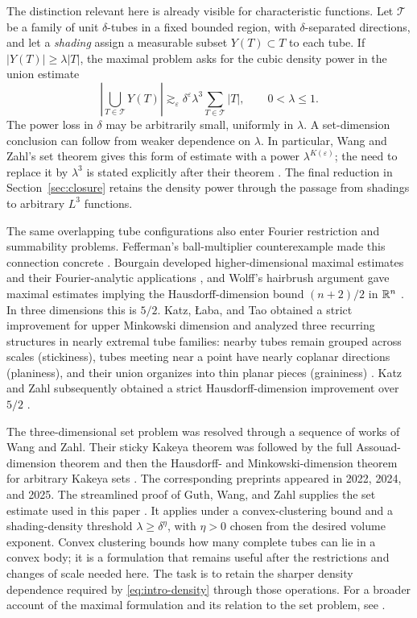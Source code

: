 The distinction relevant here is already visible for characteristic
functions. Let \(\mathcal T\) be a family of unit \(\delta\)-tubes in a fixed bounded region, with
\(\delta\)-separated directions, and let a \emph{shading} assign a
measurable subset \(Y(T)\subset T\) to each tube. If
\(|Y(T)|\ge\lambda|T|\), the maximal problem asks for the cubic density
power in the union estimate
\begin{equation}\label{eq:intro-density}
\left|\bigcup_{T\in\mathcal T}Y(T)\right|
\gtrsim_\varepsilon
\delta^\varepsilon\lambda^3\sum_{T\in\mathcal T}|T|,
\qquad 0<\lambda\le1.
\end{equation}
The power loss in \(\delta\) may be arbitrarily small, uniformly in
\(\lambda\). A set-dimension conclusion can follow from weaker dependence
on \(\lambda\). In particular, Wang and Zahl's set theorem gives this
form of estimate with a power \(\lambda^{K(\varepsilon)}\); the need to
replace it by \(\lambda^3\) is stated explicitly after their theorem
\citep[Theorem~1.2]{WZ2025}. The final reduction in
Section~\ref{sec:closure} retains the density power through the passage
from shadings to arbitrary \(L^3\) functions.

The same overlapping tube configurations also enter Fourier
restriction and summability problems. Fefferman's ball-multiplier counterexample
made this connection concrete \citep{Fefferman1971}. Bourgain developed
higher-dimensional maximal estimates and their Fourier-analytic
applications \citep{Bourgain1991}, and Wolff's hairbrush argument gave maximal estimates implying
the Hausdorff-dimension bound \((n+2)/2\) in \(\mathbb R^n\)
\citep{Wolff1995}. In three dimensions this is \(5/2\). Katz,
{\L}aba, and Tao obtained a strict improvement for upper Minkowski dimension
and analyzed three recurring structures in nearly extremal tube families:
nearby tubes remain grouped across scales (stickiness), tubes meeting
near a point have nearly coplanar directions (planiness), and their
union organizes into thin planar pieces (graininess)
\citep{KLT2000}. Katz and Zahl subsequently obtained a strict
Hausdorff-dimension improvement over \(5/2\) \citep{KatzZahl2019}.

The three-dimensional set problem was resolved through a sequence of
works of Wang and Zahl. Their sticky Kakeya theorem was followed by the
full Assouad-dimension theorem and then the Hausdorff- and
Minkowski-dimension theorem for arbitrary Kakeya sets
\citep{WZSticky2026,WZAssouad2025,WZ2025}. The corresponding preprints
appeared in 2022, 2024, and 2025. The streamlined proof of Guth, Wang,
and Zahl supplies the set estimate used in this paper
\citep[Theorem~1.1]{GWZ2026}. It applies under a convex-clustering bound and a shading-density
threshold \(\lambda\ge\delta^\eta\), with \(\eta>0\) chosen from the
desired volume exponent. Convex clustering bounds
how many complete tubes can lie in a convex body; it is a formulation
that remains useful after the restrictions and changes of scale needed
here. The task is to retain the sharper density dependence required by
\eqref{eq:intro-density} through those operations. For a broader account
of the maximal formulation and its relation to the set problem, see
\citet[Conjecture~$1.3^{\prime\prime}$ and Section~3.3]{Zahl2025}.

